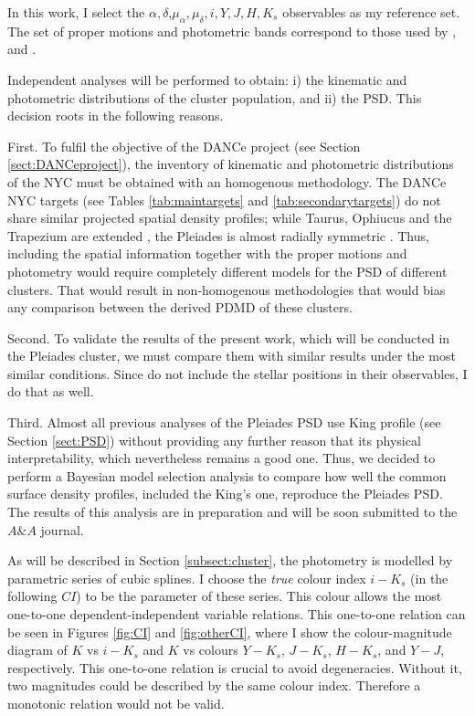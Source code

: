 {In this work, I select the $\alpha,\delta$,$\mu_{\alpha},\mu_{\delta},i,Y,J,H,K_s$ observables as my reference set. The set of proper motions and photometric bands correspond to those used by \citet{Sarro2014}, and \citet{Bouy2015}. }
 
{Independent analyses will be performed to obtain: i) the kinematic and photometric distributions of the cluster population, and ii) the PSD. This decision roots in the following reasons. }

{First. To fulfil the objective of the DANCe project (see Section \ref{sect:DANCeproject}), the inventory of kinematic and photometric distributions of the NYC must be obtained with an homogenous methodology. The DANCe NYC targets (see Tables \ref{tab:maintargets} and \ref{tab:secondarytargets}) do not share similar projected spatial density profiles; while Taurus, Ophiucus and the Trapezium are extended \cite[see for example][]{simon1997}, the Pleiades is almost radially symmetric \citep{Raboud1998}. Thus, including the spatial information together with the proper motions and photometry would require completely different models for the PSD of different clusters. That would result in non-homogenous methodologies that would bias any comparison between the derived PDMD of these clusters.}

{Second. To validate the results of the present work, which will be conducted in the Pleiades cluster, we must compare them with similar results under the most similar conditions. Since \citet{Bouy2015,Sarro2014} do not include the stellar positions in their observables, I do that as well. }

{Third. Almost all previous analyses of the Pleiades PSD use King profile (see Section \ref{sect:PSD}) without providing any further reason that its physical interpretability, which nevertheless remains a good one. Thus, we decided to perform a Bayesian model selection analysis to compare how well the common surface density profiles, included the King's one, reproduce the Pleiades PSD. The results of this analysis are in preparation and will be soon submitted to the $A\&A$ journal. }

As will be described in Section \ref{subsect:cluster}, the photometry is modelled by parametric series of cubic splines. I choose the \emph{true} colour index $i-K_s$ (in the following $CI$) to be the parameter of these series. This colour allows the most one-to-one dependent-independent variable relations. This one-to-one relation can be seen in Figures \ref{fig:CI} and \ref{fig:otherCI}, where I show the colour-magnitude diagram of $K$ vs $i-K_s$ and $K$ vs colours $Y-K_s$, $J-K_s$, $H-K_s$, and $Y-J$, respectively.  This one-to-one relation is crucial to avoid degeneracies. Without it, two magnitudes could be described by the same colour index. Therefore a monotonic relation would not be valid. 

